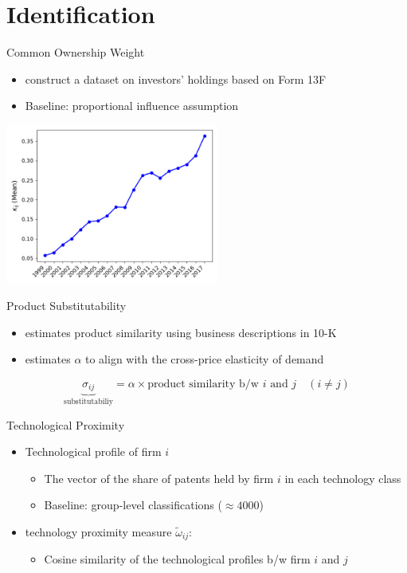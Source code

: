 \documentclass[english,aspectratio=169,handout]{beamer}
\theoremstyle{plain}
\begin{document}
\section{Identification}

\begin{frame}{Common Ownership Weight}
  \begin{itemize}
    \item \citet{Backus2021-yt} construct a dataset on investors' holdings
          based on Form 13F
    \item Baseline: \cite{Rotemberg1984-jz} proportional influence assumption
  \end{itemize}
  \begin{center}
    \includegraphics[width=7cm]{figures/kappa}
  \end{center}
\end{frame}
%
\begin{frame}{Product Substitutability}

  \begin{itemize}
    \item \citet{Hoberg2016-jm} estimates product similarity using business
          descriptions in 10-K
          \medskip{}
    \item \citet{Pellegrino2024-dn} estimates $\alpha$ to align with the cross-price
          elasticity of demand
  \end{itemize}
  \medskip{}
  \[
    \underbrace{\sigma_{ij}}_{\text{substitutabiliy}}=\alpha\times\text{product similarity b/w }i\text{ and }j\quad\left(i\neq j\right)
  \]

\end{frame}
%
\begin{frame}{Technological Proximity}
  \begin{itemize}
    \item Technological profile of firm $i$
          \begin{itemize}
            \item The vector of the share of patents held by firm
            $i$ in each technology class
            \item Baseline: group-level classifications ($\approx4000$)\medskip{}
          \end{itemize}
          \medskip{}
    \item \citet{Jaffe1986-yz} technology proximity measure $\tilde{\omega}_{ij}$:
      \begin{itemize}
      \item Cosine similarity of the technological profiles b/w firm $i$ and $j$
      \end{itemize}
  \end{itemize}
\end{frame}
\end{document}
